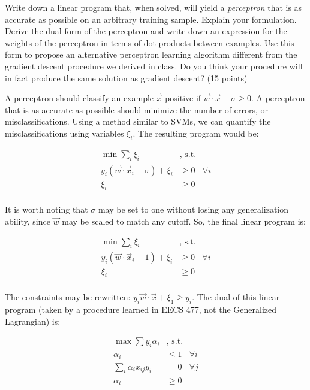 \documentclass[fleqn]{homework}
\begin{document}
  \begin{problem}{3}
    \begin{question}
      Write down a linear program that, when solved, will yield a
      \textit{perceptron} that is as accurate as possible on an arbitrary
      training sample.  Explain your formulation.  Derive the dual form of the
      perceptron and write down an expression for the weights of the perceptron
      in terms of dot products between examples.  Use this form to propose an
      alternative perceptron learning algorithm different from the gradient
      descent procedure we derived in class.  Do you think your procedure will
      in fact produce the same solution as gradient descent? (15 points)
    \end{question}

    A perceptron should classify an example $\vec{x}$ positive if
    $\vec{w} \cdot \vec{x} - \sigma \ge 0$.  A perceptron that is as accurate as
    possible should minimize the number of errors, or misclassifications.  Using
    a method similar to SVMs, we can quantify the misclassifications using
    variables $\xi_i$.  The resulting program would be:

    \begin{align*}
      \min \sum_{i} \xi_i & \text{, s.t.} \\
      y_i(\vec{w}\cdot\vec{x}_i - \sigma) + \xi_i &\ge 0 \:\:\:\: \forall i\\
      \xi_i &\ge 0 \\
    \end{align*}

    It is worth noting that $\sigma$ may be set to one without losing any
    generalization ability, since $\vec{w}$ may be scaled to match any cutoff.
    So, the final linear program is:

    \begin{align*}
      \min \sum_{i} \xi_i & \text{, s.t.} \\
      y_i(\vec{w}\cdot\vec{x}_i - 1) + \xi_i &\ge 0 \:\:\:\: \forall i\\
      \xi_i &\ge 0 \\
    \end{align*}

    The constraints may be rewritten:
    $y_i \vec{w} \cdot \vec{x} + \xi_1 \ge y_i$.  The dual of this linear
    program (taken by a procedure learned in EECS 477, not the Generalized
    Lagrangian) is:

    \begin{align*}
      \max \sum y_i \alpha_i & \text{, s.t.} \\
      \alpha_i &\le 1 \:\:\:\: \forall i \\
      \sum_i \alpha_i x_{ij} y_i &= 0 \:\:\:\: \forall j \\
      \alpha_i &\ge 0 \\
    \end{align*}


\end{problem}
\end{document}
